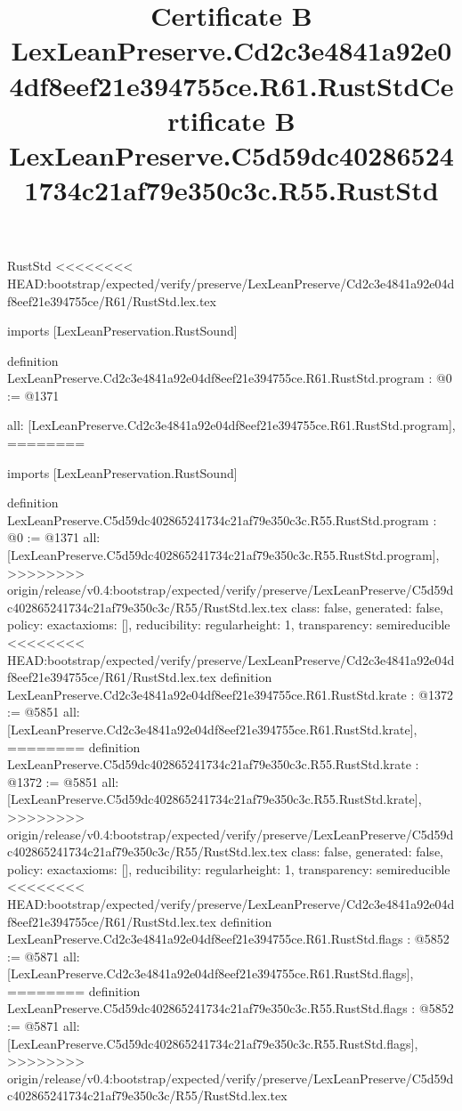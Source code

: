 \begin{lexlean}{RustStd}
<<<<<<<< HEAD:bootstrap/expected/verify/preserve/LexLeanPreserve/Cd2c3e4841a92e04df8eef21e394755ce/R61/RustStd.lex.tex
\title{Certificate B LexLeanPreserve.Cd2c3e4841a92e04df8eef21e394755ce.R61.RustStd}
\begin{coremodule}
imports [LexLeanPreservation.RustSound]

definition LexLeanPreserve.Cd2c3e4841a92e04df8eef21e394755ce.R61.RustStd.program : @0 := @1371 {
  all: [LexLeanPreserve.Cd2c3e4841a92e04df8eef21e394755ce.R61.RustStd.program],
========
\title{Certificate B LexLeanPreserve.C5d59dc402865241734c21af79e350c3c.R55.RustStd}
\begin{coremodule}
imports [LexLeanPreservation.RustSound]

definition LexLeanPreserve.C5d59dc402865241734c21af79e350c3c.R55.RustStd.program : @0 := @1371 {
  all: [LexLeanPreserve.C5d59dc402865241734c21af79e350c3c.R55.RustStd.program],
>>>>>>>> origin/release/v0.4:bootstrap/expected/verify/preserve/LexLeanPreserve/C5d59dc402865241734c21af79e350c3c/R55/RustStd.lex.tex
  class: false,
  generated: false,
  policy: exact{axioms: []},
  reducibility: regular{height: 1},
  transparency: semireducible
}
<<<<<<<< HEAD:bootstrap/expected/verify/preserve/LexLeanPreserve/Cd2c3e4841a92e04df8eef21e394755ce/R61/RustStd.lex.tex
definition LexLeanPreserve.Cd2c3e4841a92e04df8eef21e394755ce.R61.RustStd.krate : @1372 := @5851 {
  all: [LexLeanPreserve.Cd2c3e4841a92e04df8eef21e394755ce.R61.RustStd.krate],
========
definition LexLeanPreserve.C5d59dc402865241734c21af79e350c3c.R55.RustStd.krate : @1372 := @5851 {
  all: [LexLeanPreserve.C5d59dc402865241734c21af79e350c3c.R55.RustStd.krate],
>>>>>>>> origin/release/v0.4:bootstrap/expected/verify/preserve/LexLeanPreserve/C5d59dc402865241734c21af79e350c3c/R55/RustStd.lex.tex
  class: false,
  generated: false,
  policy: exact{axioms: []},
  reducibility: regular{height: 1},
  transparency: semireducible
}
<<<<<<<< HEAD:bootstrap/expected/verify/preserve/LexLeanPreserve/Cd2c3e4841a92e04df8eef21e394755ce/R61/RustStd.lex.tex
definition LexLeanPreserve.Cd2c3e4841a92e04df8eef21e394755ce.R61.RustStd.flags : @5852 := @5871 {
  all: [LexLeanPreserve.Cd2c3e4841a92e04df8eef21e394755ce.R61.RustStd.flags],
========
definition LexLeanPreserve.C5d59dc402865241734c21af79e350c3c.R55.RustStd.flags : @5852 := @5871 {
  all: [LexLeanPreserve.C5d59dc402865241734c21af79e350c3c.R55.RustStd.flags],
>>>>>>>> origin/release/v0.4:bootstrap/expected/verify/preserve/LexLeanPreserve/C5d59dc402865241734c21af79e350c3c/R55/RustStd.lex.tex
}}}
\end{coremodule}}
\end{coremodule}
\end{lexlean}
